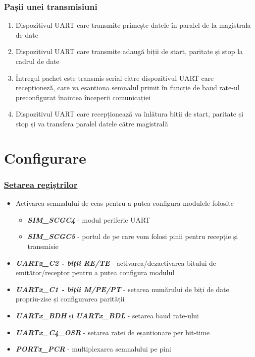 \documentclass[xcolor={table}]{beamer}
\begin{document}
		\begin{frame}
		    \frametitle{Pașii unei transmisiuni}
		    \begin{enumerate}
		        \item Dispozitivul UART care transmite primește datele în paralel de la magistrala de date
		        \item Dispozitivul UART care transmite adaugă biții de start, paritate și stop la cadrul de date
		        \item Întregul pachet este transmis serial către dispozitivul UART care recepționeză, care va eșantiona semnalul primit în funcție de baud rate-ul preconfigurat înaintea începerii comunicației
		        \item Dispozitivul UART care recepționează va înlătura biții de start, paritate și stop și va transfera paralel datele către magistrală
		    \end{enumerate}
		\end{frame}
        \section{Configurare}
        \begin{frame}
                \frametitle{ \href{https://github.com/undacmic/MCULabs/blob/main/Resurse/FRDM-KL25Z_ReferenceManual.pdf}{Setarea regiștrilor}}
                \begin{itemize}
                    \item Activarea semnalului de ceas pentru a putea configura modulele folosite 
                    \begin{itemize}
                        \item \textbf{\textit{SIM\_SCGC4}} - modul periferic UART
                        \item \textbf{\textit{SIM\_SCGC5}} - portul de pe care vom folosi pinii pentru recepție și transmisie
                    \end{itemize}
                    \item \textbf{\textit{UARTx\_C2 - biții RE/TE }} - activarea/dezactivarea bitului de emițător/receptor pentru a putea configura modulul
                    \item \textbf{\textit{UARTx\_C1 - biții M/PE/PT}} - setarea numărului de biți de date propriu-zise și configurarea parității
                    \item \textbf{\textit{UARTx\_BDH}} și \textbf{\textit{UARTx\_BDL}} - setarea baud rate-ului
                    \item \textbf{\textit{UARTx\_C4\_OSR}} - setarea ratei de eșantionare per bit-time
                    \item \textbf{\textit{PORTx\_PCR}} - multiplexarea semnalului pe pini
                \end{itemize}
        \end{frame}
\end{document}
